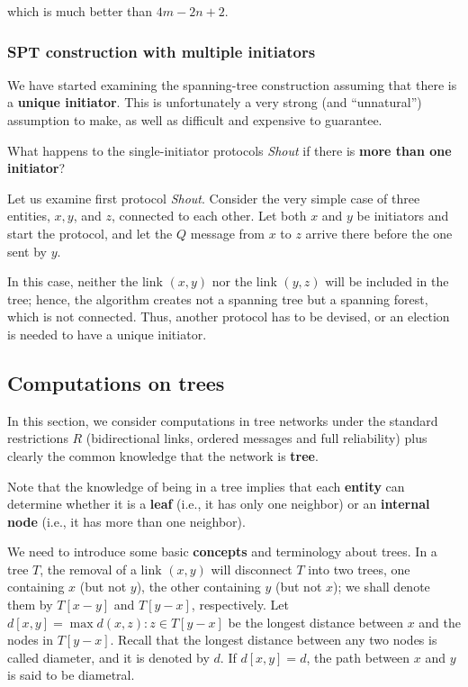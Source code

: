 which is much better than $4m -2n +2$.

\subsubsection{SPT construction with multiple initiators}
We have started examining the spanning-tree construction assuming that there is a \textbf{unique initiator}. This is unfortunately a very strong (and “unnatural”) assumption to make, as well as difficult and expensive to guarantee. 

What happens to the single-initiator protocols \textit{Shout} if there is \textbf{more than one initiator}? 

Let us examine first protocol \textit{Shout}. Consider the very simple case of three entities, $x, y$, and $z$, connected to each other. Let both $x$ and $y$ be initiators and start the protocol, and let the $Q$ message from $x$ to $z$ arrive there before the one sent by $y$.


In this case, neither the link $(x,y)$ nor the link $(y,z)$ will be included in the tree; hence, the algorithm creates not a spanning tree but a spanning forest, which is not connected. Thus, another protocol has to be devised, or an election is needed to have a unique initiator.

\subsection{Computations on trees}
In this section, we consider computations in tree networks under the standard restrictions $R$ (bidirectional links, ordered messages and full reliability) plus clearly the common knowledge that the network is \textbf{tree}. 

Note that the knowledge of being in a tree implies that each \textbf{entity} can determine whether it is a \textbf{leaf} (i.e., it has only one neighbor) or an \textbf{internal node} (i.e., it has more than one neighbor).

We need to introduce some basic \textbf{concepts} and terminology about trees. In a tree $T$, the removal of a link $(x,y)$ will disconnect $T$ into two trees, one containing $x$ (but not $y$), the other containing $y$ (but not $x$); we shall denote them by $T[x - y]$ and $T[y - x]$, respectively. Let $d[x, y] = \max{d(x, z): z \in T[y - x]}$ be the longest distance between $x$ and the nodes in $T[y - x]$. Recall that the longest distance between any two nodes is called diameter, and it is denoted by $d$. If $d[x, y] = d$, the path between $x$ and $y$ is said to be diametral.

